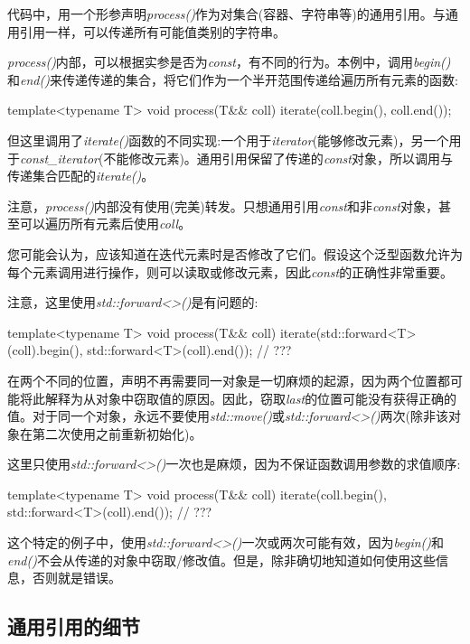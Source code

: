 代码中，用一个形参声明\textit{process()}作为对集合(容器、字符串等)的通用引用。与通用引用一样，可以传递所有可能值类别的字符串。

\textit{process()}内部，可以根据实参是否为\textit{const}，有不同的行为。本例中，调用\textit{begin()}和\textit{end()}来传递传递的集合，将它们作为一个半开范围传递给遍历所有元素的函数:

\begin{cppcode}
template<typename T>
void process(T&& coll)
{
	iterate(coll.begin(), coll.end());
}
\end{cppcode}

但这里调用了\textit{iterate()}函数的不同实现:一个用于\textit{iterator}(能够修改元素)，另一个用于\textit{const_iterator}(不能修改元素)。通用引用保留了传递的\textit{const}对象，所以调用与传递集合匹配的\textit{iterate()}。

注意，\textit{process()}内部没有使用(完美)转发。只想通用引用\textit{const}和非\textit{const}对象，甚至可以遍历所有元素后使用\textit{coll}。

您可能会认为，应该知道在迭代元素时是否修改了它们。假设这个泛型函数允许为每个元素调用进行操作，则可以读取或修改元素，因此\textit{const}的正确性非常重要。

注意，这里使用\textit{std::forward<>()}是有问题的:

\begin{cppcode}
template<typename T>
void process(T&& coll)
{
	iterate(std::forward<T>(coll).begin(), std::forward<T>(coll).end()); // ???
}
\end{cppcode}

在两个不同的位置，声明不再需要同一对象是一切麻烦的起源，因为两个位置都可能将此解释为从对象中窃取值的原因。因此，窃取\textit{last}的位置可能没有获得正确的值。对于同一个对象，永远不要使用\textit{std::move()}或\textit{std::forward<>()}两次(除非该对象在第二次使用之前重新初始化)。

这里只使用\textit{std::forward<>()}一次也是麻烦，因为不保证函数调用参数的求值顺序:

\begin{cppcode}
template<typename T>
void process(T&& coll)
{
	iterate(coll.begin(), std::forward<T>(coll).end()); // ???
}
\end{cppcode}

这个特定的例子中，使用\textit{std::forward<>()}一次或两次可能有效，因为\textit{begin()}和\textit{end()}不会从传递的对象中窃取/修改值。但是，除非确切地知道如何使用这些信息，否则就是错误。

\subsection{通用引用的细节}


